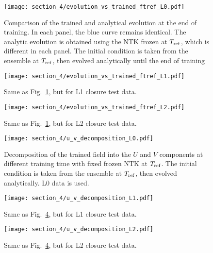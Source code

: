 \begin{figure}[t]
  \centering
  \texttt{[image: section\_4/evolution\_vs\_trained\_ftref\_L0.pdf]}
  \caption{Comparison of the trained and analytical evolution at the end of
  training. In each panel, the blue curve remains identical. The analytic
  evolution is obtained using the NTK frozen at $T_{\rm ref}$, which is
  different in each panel. The initial condition is taken from the ensemble at
  $T_{\rm ref}$, then evolved analytically until the end of training}
  \label{fig:OnsetLazyL0}
\end{figure}
\begin{figure}[t]
  \centering
  \texttt{[image: section\_4/evolution\_vs\_trained\_ftref\_L1.pdf]} 
  \caption{Same as Fig.~\ref{fig:OnsetLazyL0}, but for L1 closure test data.}
  \label{fig:OnsetLazyL1}
\end{figure}
\begin{figure}[t]
  \centering
  \texttt{[image: section\_4/evolution\_vs\_trained\_ftref\_L2.pdf]} 
  \caption{Same as Fig.~\ref{fig:OnsetLazyL0}, but for L2 closure test data.}
  \label{fig:OnsetLazyL2}
\end{figure}

\begin{figure}[t]
  \centering
  \texttt{[image: section\_4/u\_v\_decomposition\_L0.pdf]}
  \caption{Decomposition of the trained field into the $U$ and $V$ components
  at different training time with fixed frozen NTK at $T_{\rm ref}$. The initial
  condition is taken from the ensemble at $T_{\rm ref}$, then evolved
  analytically. L0 data is used.}
  \label{fig:FrefDecompositionL0}
\end{figure}
\begin{figure}[t]
  \centering
  \texttt{[image: section\_4/u\_v\_decomposition\_L1.pdf]} 
  \caption{Same as Fig.~\ref{fig:FrefDecompositionL0}, but for L1 closure test
  data.}
  \label{fig:FrefDecompositionL1}
\end{figure}
\begin{figure}[t]
  \centering
  \texttt{[image: section\_4/u\_v\_decomposition\_L2.pdf]} 
  \caption{Same as Fig.~\ref{fig:FrefDecompositionL0}, but for L2 closure test
  data.}
  \label{fig:FrefDecompositionL2}
\end{figure}

